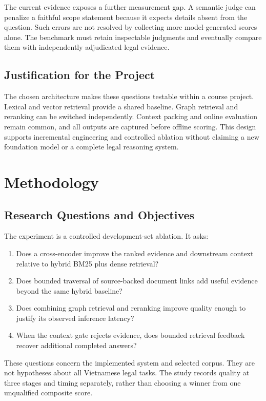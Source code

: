 \documentclass[11pt,a4paper,oneside]{report}
\begin{document}
The current evidence exposes a further measurement gap. A semantic judge can penalize a faithful scope statement because it expects details absent from the question. Such errors are not resolved by collecting more model-generated scores alone. The benchmark must retain inspectable judgments and eventually compare them with independently adjudicated legal evidence.

\section{Justification for the Project}
The chosen architecture makes these questions testable within a course project. Lexical and vector retrieval provide a shared baseline. Graph retrieval and reranking can be switched independently. Context packing and online evaluation remain common, and all outputs are captured before offline scoring. This design supports incremental engineering and controlled ablation without claiming a new foundation model or a complete legal reasoning system.

\chapter{Methodology}\label{ch:methodology}
\section{Research Questions and Objectives}
The experiment is a controlled development-set ablation. It asks:
\begin{enumerate}
\item Does a cross-encoder improve the ranked evidence and downstream context relative to hybrid BM25 plus dense retrieval?
\item Does bounded traversal of source-backed document links add useful evidence beyond the same hybrid baseline?
\item Does combining graph retrieval and reranking improve quality enough to justify its observed inference latency?
\item When the context gate rejects evidence, does bounded retrieval feedback recover additional completed answers?
\end{enumerate}
These questions concern the implemented system and selected corpus. They are not hypotheses about all Vietnamese legal tasks. The study records quality at three stages and timing separately, rather than choosing a winner from one unqualified composite score.
\end{document}
